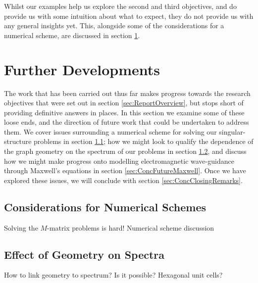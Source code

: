 Whilst our examples help us explore the second and third objectives, and do provide us with some intuition about what to expect, they do not provide us with any general insights yet.
This, alongside some of the considerations for a numerical scheme, are discussed in section \ref{sec:ConcFuture}.

\section{Further Developments} \label{sec:ConcFuture}
The work that has been carried out thus far makes progress towards the research objectives that were set out in section \ref{sec:ReportOverview}, but stops short of providing definitive answers in places.
In this section we examine some of these loose ends, and the direction of future work that could be undertaken to address them.
We cover issues surrounding a numerical scheme for solving our singular-structure problems in section \ref{sec:ConcFutureNumerical}; how we might look to qualify the dependence of the graph geometry on the spectrum of our problems in section \ref{sec:ConcFutureGeometry}, and discuss how we might make progress onto modelling electromagnetic wave-guidance through Maxwell's equations in section \ref{sec:ConcFutureMaxwell}.
Once we have explored these issues, we will conclude with section \ref{sec:ConcClosingRemarks}.

\subsection{Considerations for Numerical Schemes} \label{sec:ConcFutureNumerical}
Solving the $M$-matrix problems is hard! Numerical scheme discussion

\subsection{Effect of Geometry on Spectra} \label{sec:ConcFutureGeometry}
How to link geometry to spectrum? Is it possible? Hexagonal unit cells?

